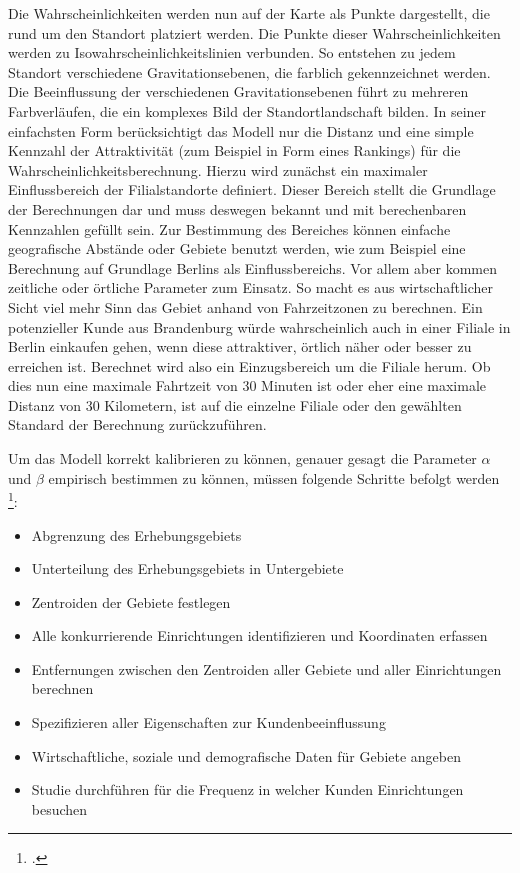 Die Wahrscheinlichkeiten werden nun auf der Karte als Punkte dargestellt, die rund um den Standort platziert werden. 
Die Punkte dieser Wahrscheinlichkeiten werden zu Isowahrscheinlichkeitslinien verbunden. 
So entstehen zu jedem Standort verschiedene Gravitationsebenen, die farblich gekennzeichnet werden. 
Die Beeinflussung der verschiedenen Gravitationsebenen führt zu mehreren Farbverläufen, die ein komplexes Bild der Standortlandschaft bilden.
In seiner einfachsten Form berücksichtigt das Modell nur die Distanz und eine simple Kennzahl der Attraktivität (zum Beispiel in Form eines Rankings) für die Wahrscheinlichkeitsberechnung. 
Hierzu wird zunächst ein maximaler Einflussbereich der Filialstandorte definiert. 
Dieser Bereich stellt die Grundlage der Berechnungen dar und muss deswegen bekannt und mit berechenbaren Kennzahlen gefüllt sein.
Zur Bestimmung des Bereiches können einfache geografische Abstände oder Gebiete benutzt werden, wie zum Beispiel eine Berechnung auf Grundlage Berlins als Einflussbereichs.
Vor allem aber kommen zeitliche oder örtliche Parameter zum Einsatz.
So macht es aus wirtschaftlicher Sicht viel mehr Sinn das Gebiet anhand von Fahrzeitzonen zu berechnen.
Ein potenzieller Kunde aus Brandenburg würde wahrscheinlich auch in einer Filiale in Berlin einkaufen gehen, wenn diese attraktiver, örtlich näher oder besser zu erreichen ist.
Berechnet wird also ein Einzugsbereich um die Filiale herum.
Ob dies nun eine maximale Fahrtzeit von 30 Minuten ist oder eher eine maximale Distanz von 30 Kilometern, ist auf die einzelne Filiale oder den gewählten Standard der Berechnung zurückzuführen.

Um das Modell korrekt kalibrieren zu können, genauer gesagt die Parameter $\alpha$ und $\beta$ empirisch bestimmen zu können, müssen folgende Schritte befolgt werden \footcite{huff_calibrating_2008}:

\begin{itemize}
	\item Abgrenzung des Erhebungsgebiets
	\item Unterteilung des Erhebungsgebiets in Untergebiete
	\item Zentroiden der Gebiete festlegen
	\item Alle konkurrierende Einrichtungen identifizieren und Koordinaten erfassen
	\item Entfernungen zwischen den Zentroiden aller Gebiete und aller Einrichtungen berechnen
	\item Spezifizieren aller Eigenschaften zur Kundenbeeinflussung
	\item Wirtschaftliche, soziale und demografische Daten für Gebiete angeben
	\item Studie durchführen für die Frequenz in welcher Kunden Einrichtungen besuchen
\end{itemize}


